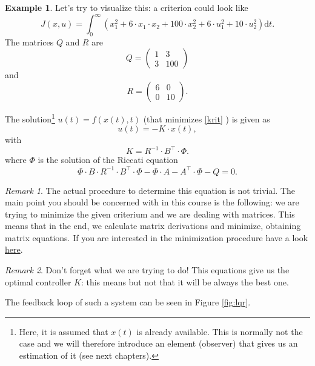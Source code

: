 \documentclass[a4paper,12 pt]{article}
\numberwithin{equation}{section}
\theoremstyle{definition}
\newtheorem{bsp}{Example}
\theoremstyle{remark}
\newtheorem*{bmk}{Remark}
\theoremstyle{definition}
\theoremstyle{definition}
\theoremstyle{definition}
\theoremstyle{remark}
\begin{document}
\begin{bsp}
Let's try to visualize this: a criterion could look like
\begin{equation*}
J(x,u)=\int_0^\infty \left( x_1^2+6\cdot x_1\cdot x_2+100\cdot x_2^2+6\cdot u_1^2+10\cdot u_2^2 \right)\text{d}t.
\end{equation*}
The matrices $Q$ and $R$ are
\begin{equation*}
Q=\begin{pmatrix}
1&3\\
3&100
\end{pmatrix}
\end{equation*}
and
\begin{equation*}
R=\begin{pmatrix}
6&0\\
0&10
\end{pmatrix}.
\end{equation*}


\end{bsp}
The solution\footnote{Here, it is assumed that $x(t)$ is already available. This is normally not the case and we will therefore introduce an element (observer) that gives us an estimation of it (see next chapters).} $u(t)=f(x(t),t)$ (that minimizes \eqref{krit} ) is given as
\begin{equation}
u(t)=-K\cdot x(t),
\end{equation} with
\begin{equation}
 K=R^{-1}\cdot B^\intercal\cdot \Phi.
\end{equation}
where $\Phi$  is the solution of the Riccati equation
\begin{equation}
\Phi\cdot B\cdot R^{-1}\cdot B^\intercal\cdot \Phi-\Phi\cdot A-A^\intercal\cdot \Phi-Q=0.
\end{equation}
\begin{bmk}
The actual procedure to determine this equation is not trivial. The main point you should be concerned with in this course is the following: we are trying to minimize the given criterium and we are dealing with matrices. This means that in the end, we calculate matrix derivations and minimize, obtaining matrix equations. If you are interested in the minimization procedure have a look \href{https://www.cds.caltech.edu/~murray/courses/cds110/wi06/lqr.pdf}{here}.
\end{bmk}
\begin{bmk}
Don't forget what we are trying to do! This equations give us the optimal controller $K$: this means but not that it will be always the best one.
\end{bmk}
The feedback loop of such a system can be seen in Figure \ref{fig:lqr}. 
\end{document}
